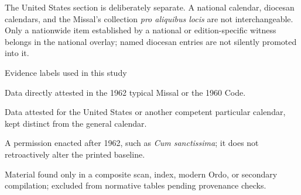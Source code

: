 {The United States section is deliberately separate. A national calendar, diocesan calendars, and the Missal's collection \emph{pro aliquibus locis} are not interchangeable. Only a nationwide item established by a national or edition-specific witness belongs in the national overlay; named diocesan entries are not silently promoted into it.

\begin{studybox}{Evidence labels used in this study}
\begin{description}[style=multiline,leftmargin=0.28\linewidth,labelwidth=0.25\linewidth,itemsep=0.3em]
\item[Printed baseline] Data directly attested in the 1962 typical Missal or the 1960 Code.
\item[Particular layer] Data attested for the United States or another competent particular calendar, kept distinct from the general calendar.
\item[Later option] A permission enacted after 1962, such as \emph{Cum sanctissima}; it does not retroactively alter the printed baseline.
\item[Unresolved lead] Material found only in a composite scan, index, modern Ordo, or secondary compilation; excluded from normative tables pending provenance checks.
\end{description}
\end{studybox}
}
